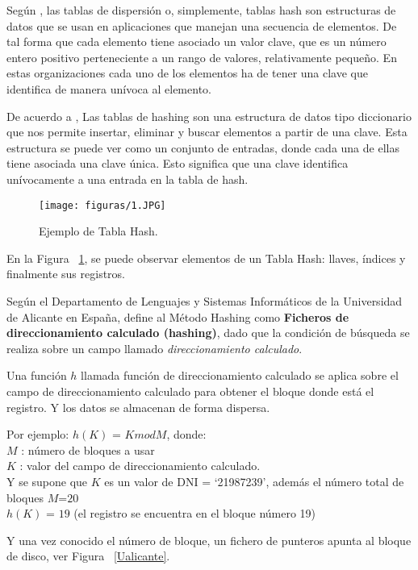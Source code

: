 \documentclass[10pt,conference]{IEEEtran}
\begin{document}
Según \citep{joyanes}, las tablas de dispersión o, simplemente, tablas hash son estructuras de datos que se usan en aplicaciones que manejan una secuencia de elementos. De tal forma que cada elemento tiene asociado un valor clave, que es un número entero positivo perteneciente a un rango de valores, relativamente pequeño. En estas organizaciones cada uno de los elementos ha de tener una clave que identifica de manera unívoca al elemento.

De acuerdo a \citep{weis}, Las tablas de hashing son una estructura de datos tipo diccionario que nos permite insertar, eliminar y buscar elementos a partir de una clave. Esta estructura se puede ver como un conjunto de entradas, donde cada una de ellas tiene asociada una clave única. Esto significa que una clave identifica unívocamente a una entrada en la tabla de hash.

\begin{figure}[H]
 \begin{center}
       \texttt{[image: figuras/1.JPG]}
      \caption{Ejemplo de Tabla Hash.}
      \label{f1} 
      \end{center}
\end{figure}
En la Figura ~\ref{f1}, se puede observar elementos de un Tabla Hash: llaves, índices y finalmente sus registros.

Según el Departamento de Lenguajes y Sistemas Informáticos de la Universidad de Alicante en España,\citep{organizacion} define al Método Hashing como \textbf{Ficheros de direccionamiento calculado (hashing)}, dado que la condición de búsqueda se realiza sobre un campo llamado \textit{direccionamiento calculado}.

Una función $h$ llamada función de direccionamiento calculado se aplica sobre el campo de direccionamiento calculado para obtener el bloque donde está el registro. Y los datos se almacenan de forma dispersa.

Por ejemplo: $h(K)$ = $K mod M$, donde:\\
$M$ : número de bloques a usar\\
$K$ : valor del campo de direccionamiento calculado. \\
Y se supone que $K$ es un valor de DNI = ‘21987239’, además el número total de bloques $M$=$20$ \\
$h(K)$ = $19$ (el registro se encuentra en el bloque número 19)

Y una vez conocido el número de bloque, un fichero de punteros apunta al bloque de disco, ver Figura ~\ref{Ualicante}.
\end{document}
